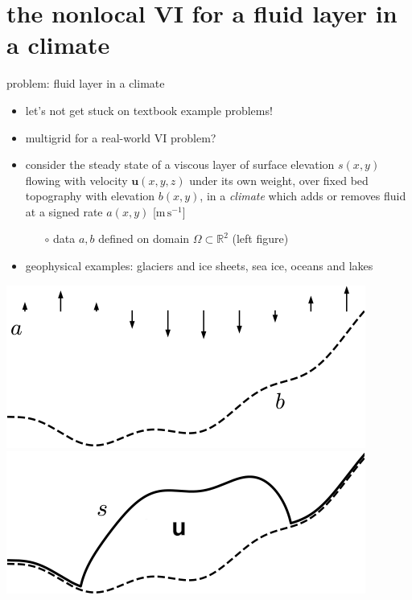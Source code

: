 \documentclass[svgnames,
               hyperref={colorlinks,citecolor=DeepPink4,linkcolor=FireBrick,urlcolor=Maroon},
               usepdftitle=false]  %
               {beamer}
\newcommand{\RR}{\mathbb{R}}
\newcommand{\bu}{\mathbf{u}}
\begin{document}
\section{the nonlocal VI for a fluid layer in a climate}

\begin{frame}{problem: fluid layer in a climate}

\begin{itemize}
\item let's not get stuck on textbook example problems!
\item multigrid for a real-world VI problem?
\item consider the steady state of a viscous layer of surface elevation $s(x,y)$ flowing with velocity $\bu(x,y,z)$ under its own weight, over fixed bed topography with elevation $b(x,y)$, in a \emph{climate} which adds or removes fluid at a signed rate $a(x,y)$ [$\text{m}\,\text{s}^{-1}$]
    \begin{itemize}
    \item[$\circ$] data $a,b$ defined on domain $\Omega \subset \RR^2$ (left figure)
    \end{itemize}
\item geophysical examples: \alert{glaciers and ice sheets}, sea ice, oceans and lakes
\end{itemize}

\bigskip
\hfill \mbox{\includegraphics[height=0.25\textheight]{images/domain-data.png} \hspace{7mm} \includegraphics[height=0.25\textheight]{images/domain-velocity.png}}
\end{frame}
\end{document}
